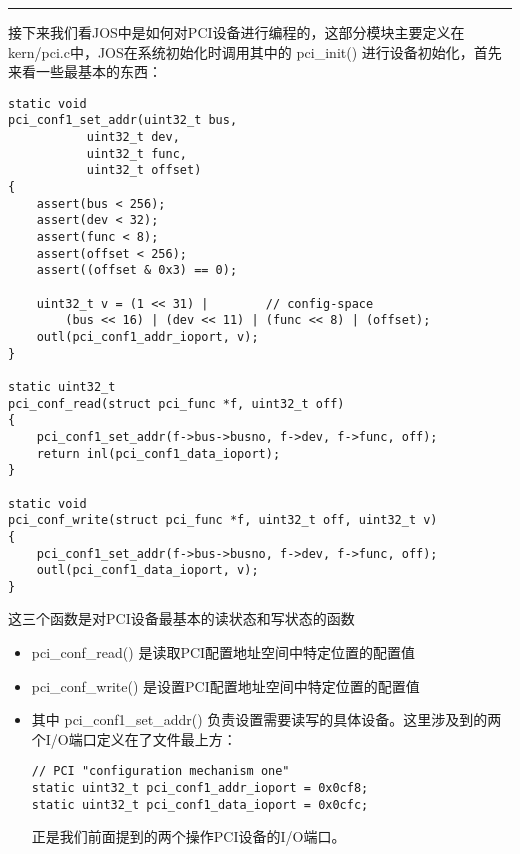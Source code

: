 \documentclass{article}
\newcommand{\funcname}[1]{{\ttfamily \small #1}}
\begin{document}
\begin{CJK*}{UTF8}{gkai}
\vspace{3em}
\hrule
\vspace{2em}

接下来我们看JOS中是如何对PCI设备进行编程的，这部分模块主要定义在kern/pci.c中，JOS在系统初始化时调用其中的 \funcname{pci\_init()} 进行设备初始化，首先来看一些最基本的东西：

\begin{lstlisting}[style=ccode, firstnumber=36, title={\scriptsize \ttfamily \bfseries kern/pci.c}]
static void
pci_conf1_set_addr(uint32_t bus,
		   uint32_t dev,
		   uint32_t func,
		   uint32_t offset)
{
	assert(bus < 256);
	assert(dev < 32);
	assert(func < 8);
	assert(offset < 256);
	assert((offset & 0x3) == 0);
	
	uint32_t v = (1 << 31) |		// config-space
		(bus << 16) | (dev << 11) | (func << 8) | (offset);
	outl(pci_conf1_addr_ioport, v);
}

static uint32_t
pci_conf_read(struct pci_func *f, uint32_t off)
{
	pci_conf1_set_addr(f->bus->busno, f->dev, f->func, off);
	return inl(pci_conf1_data_ioport);
}

static void
pci_conf_write(struct pci_func *f, uint32_t off, uint32_t v)
{
	pci_conf1_set_addr(f->bus->busno, f->dev, f->func, off);
	outl(pci_conf1_data_ioport, v);
}
\end{lstlisting}


这三个函数是对PCI设备最基本的读状态和写状态的函数

\begin{itemize}
\item{\funcname{pci\_conf\_read()} 是读取PCI配置地址空间中特定位置的配置值}
\item{\funcname{pci\_conf\_write()} 是设置PCI配置地址空间中特定位置的配置值}

\item{其中 \funcname{ pci\_conf1\_set\_addr() } 负责设置需要读写的具体设备。这里涉及到的两个I/O端口定义在了文件最上方：


\begin{lstlisting}[style=ccode, firstnumber=12, title={\scriptsize \ttfamily \bfseries kern/pci.c}]
// PCI "configuration mechanism one"
static uint32_t pci_conf1_addr_ioport = 0x0cf8;
static uint32_t pci_conf1_data_ioport = 0x0cfc;
\end{lstlisting}

正是我们前面提到的两个操作PCI设备的I/O端口。
}

\end{itemize}

\vspace{2em}



\end{CJK*}
\end{document}
